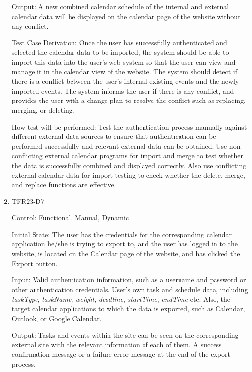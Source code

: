\documentclass[12pt, titlepage]{article}
\begin{document}
\begin{enumerate}
Output: A new combined calendar schedule of the internal and external calendar data will be displayed on the calendar page of the website without any conflict. 

Test Case Derivation: Once the user has successfully authenticated and selected the calendar data to be imported, the system should be able to import this data into the user's web system so that the user can view and manage it in the calendar view of the website. The system should detect if there is a conflict between the user's internal existing events and the newly imported events. The system informs the user if there is any conflict, and provides the user with a change plan to resolve the conflict such as replacing, merging, or deleting.

How test will be performed: Test the authentication process manually against different external data sources to ensure that authentication can be performed successfully and relevant external data can be obtained. Use non-conflicting external calendar programs for import and merge to test whether the data is successfully combined and displayed correctly. Also use conflicting external calendar data for import testing to check whether the delete, merge, and replace functions are effective.

\item{TFR23-D7\\}

Control: Functional, Manual, Dynamic
					
Initial State: The user has the credentials for the corresponding calendar application he/she is trying to export to, and the user has logged in to the website, is located on the Calendar page of the website, and has clicked the Export button.
					
Input: Valid authentication information, such as a username and password or other authentication credentials. User's own task and schedule data, including \textit{taskType}, \textit{taskName}, \textit{weight}, \textit{deadline}, \textit{startTime}, \textit{endTime} etc. Also, the target calendar applications to which the data is exported, such as Calendar, Outlook, or Google Calendar.
					
Output: Tasks and events within the site can be seen on the corresponding external site with the relevant information of each of them. A success confirmation message or a failure error message at the end of the export process.


\end{enumerate}
\end{document}
